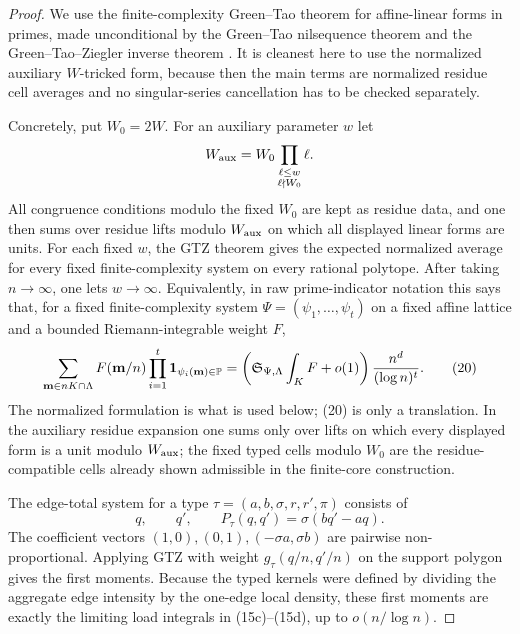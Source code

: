 \documentclass[11pt]{article}
\newcommand{\Pset}{\mathbb P}
\newcommand{\one}{\mathbf 1}
\begin{document}
\begin{proof}
We use the finite-complexity Green--Tao theorem for affine-linear forms in
primes, made unconditional by the Green--Tao nilsequence theorem and the
Green--Tao--Ziegler inverse theorem
\cite{GT2010,GT2012MN,GTZ2012}.  It is cleanest here to use the normalized
auxiliary $W$-tricked form, because then the main terms are normalized residue
cell averages and no singular-series cancellation has to be checked separately.

Concretely, put $W_0=2W$.  For an auxiliary parameter $w$ let
\[
  W_{\rm aux}=W_0\prod_{\substack{\ell\le w\\ \ell\nmid W_0}}\ell .
\]
All congruence conditions modulo the fixed $W_0$ are kept as residue data, and
one then sums over residue lifts modulo $W_{\rm aux}$ on which all displayed
linear forms are units.  For each fixed $w$, the GTZ theorem gives the expected
normalized average for every fixed finite-complexity system on every rational
polytope.  After taking $n\to\infty$, one lets $w\to\infty$.  Equivalently, in
raw prime-indicator notation this says that, for a fixed finite-complexity
system $\Psi=(\psi_1,\ldots,\psi_t)$ on a fixed affine lattice and a bounded
Riemann-integrable weight $F$,
\[
  \sum_{\mathbf m\in nK\cap\Lambda}
  F(\mathbf m/n)\prod_{i=1}^t\one_{\psi_i(\mathbf m)\in\Pset}
  =\left(\mathfrak S_{\Psi,\Lambda}\int_KF+o(1)\right)
  {n^d\over(\log n)^t}.                                  \tag{20}
\]
The normalized formulation is what is used below; (20) is only a translation.
In the auxiliary residue expansion one sums only over lifts on which every
displayed form is a unit modulo $W_{\rm aux}$; the fixed typed cells modulo
$W_0$ are the residue-compatible cells already shown admissible in the
finite-core construction.

The edge-total system for a type $\tau=(a,b,\sigma,r,r',\pi)$ consists of
\[
  q,
  \qquad q',
  \qquad P_\tau(q,q')=\sigma(bq'-aq).                    \tag{21}
\]
The coefficient vectors $(1,0),(0,1),(-\sigma a,\sigma b)$ are pairwise
non-proportional.  Applying GTZ with weight $g_\tau(q/n,q'/n)$ on the support
polygon gives the first moments.  Because the typed kernels were defined by
dividing the aggregate edge intensity by the one-edge local density, these first
moments are exactly the limiting load integrals in (15c)--(15d), up to
$o(n/\log n)$.


\end{proof}
\end{document}
